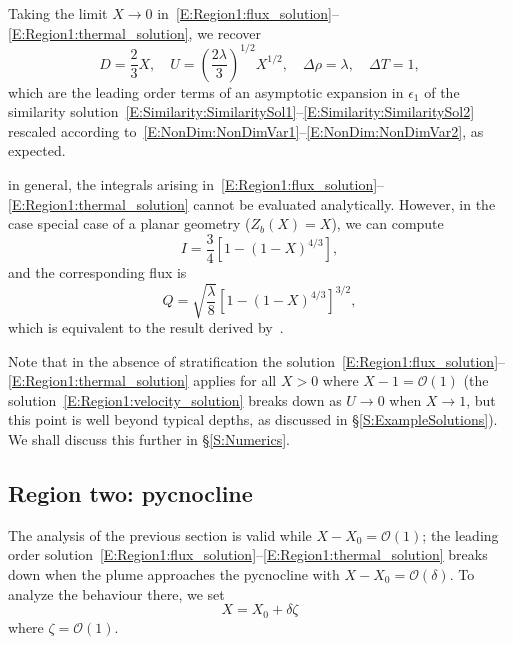 \documentclass{jfm}
\newcommand{\order}[1]{\mathcal{O}(#1)}
\newcommand{\epsone}{\epsilon_{1}} %
\newcommand{\lt}{\delta} %
\begin{document}
Taking the limit $X \to 0$ in~\eqref{E:Region1:flux_solution}--\eqref{E:Region1:thermal_solution}, we recover 
\begin{equation}\label{E:Region1:dimensionless_similarity}
D = \frac{2}{3}X, \quad U = \left(\frac{2\lambda}{3}\right)^{1/2}X^{1/2}, \quad \Delta \rho = \lambda, \quad \Delta T = 1,
\end{equation} 
which are the leading order terms of an asymptotic expansion in $\epsone$ of the similarity solution~\eqref{E:Similarity:SimilaritySol1}--\eqref{E:Similarity:SimilaritySol2} rescaled according to~\eqref{E:NonDim:NonDimVar1}--\eqref{E:NonDim:NonDimVar2}, as expected.

in general, the integrals arising in~\eqref{E:Region1:flux_solution}--\eqref{E:Region1:thermal_solution} cannot be evaluated analytically. However, in the case special case of a planar geometry ($Z_b(X) = X$), we can compute 
\begin{equation}
    I = \frac{3}{4}\left[1 - (1 - X)^{4/3}\right],
\end{equation}
and the corresponding flux is
\begin{equation}\label{E:Region1:Lazeroms_flux}
Q =  \sqrt{\frac{\lambda}{8}}\left[1 - (1-X)^{4/3}\right]^{3/2},
\end{equation}
which is equivalent to the result derived by~\cite{Lazeroms2019JPhysOcean}.

Note that in the absence of stratification the solution~\eqref{E:Region1:flux_solution}--\eqref{E:Region1:thermal_solution} applies for all $X> 0$ where $X - 1 = \mathcal{O}(1)$ (the solution~\eqref{E:Region1:velocity_solution} breaks down as $U \to 0$ when $X \to 1$, but this point is well beyond typical depths, as discussed in \S\ref{S:ExampleSolutions}). We shall discuss this further in \S\ref{S:Numerics}.

\subsection{Region two: pycnocline}\label{S:Asymptotics:Region2}
The analysis of the previous section is valid while $X - X_0 = \mathcal{O}(1)$; the leading order solution~\eqref{E:Region1:flux_solution}--\eqref{E:Region1:thermal_solution} breaks down when the plume approaches the pycnocline with $X - X_0 = \order{\delta}$. To analyze the behaviour there, we set
\begin{equation}\label{E:pycnocline:length_scaling}
X = X_0 + \lt \zeta
\end{equation}
where $\zeta = \mathcal{O}(1)$. 
\end{document}
